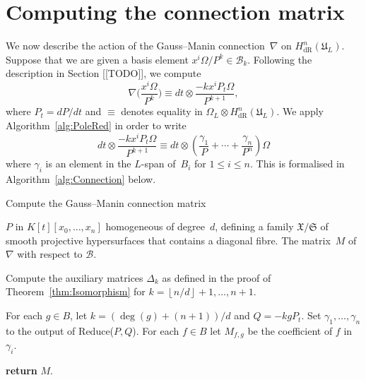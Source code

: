 \documentclass[a4paper,11pt]{article}
\numberwithin{equation}{section}
\providecommand{\floor}[1]{\left\lfloor#1\right\rfloor}   %
\providecommand{\HdR}{H_{\text{dR}}}    %
\providecommand{\cB}{\mathcal{B}} %
\theoremstyle{definition}
\begin{document}

\section{Computing the connection matrix}
\label{sec:Connection}

We now describe the action of the Gauss--Manin connection~$\nabla$ on 
$\HdR^n(\mathfrak{U}_L)$.  Suppose that we are given a basis element 
$x^i \Omega / P^k \in \cB_k$.  Following the description in Section [[TODO]], 
we compute
\begin{equation} \label{eqn:nabla}
\nabla \biggl(\frac{x^i \Omega}{P^k}\biggr) \equiv 
dt \otimes \frac{- k x^i P_t \Omega}{P^{k+1}},
\end{equation}
where $P_t = dP/dt$ and $\equiv$ denotes equality in 
$\Omega_{L} \otimes \HdR^n(\mathfrak{U}_L)$. We apply 
Algorithm~\ref{alg:PoleRed} in order to write
\begin{equation}
dt \otimes \frac{- k x^i P_t \Omega}{P^{k+1}} \equiv 
dt \otimes \left( \frac{\gamma_{1}}{P} + \dotsb + \frac{\gamma_n}{P^n} \right) \Omega
\end{equation}
where $\gamma_i$ is an element in the $L$-span of~$B_i$ for $1 \leq i \leq n$. This is
formalised in Algorithm~\ref{alg:Connection} below.

\begin{algorithm}
\caption{Compute the Gauss--Manin connection matrix}
\label{alg:Connection}
\begin{algorithmic}
\Require $P$ in $K[t][x_0, \dotsc, x_n]$ homogeneous of degree~$d$, 
         defining a family $\mathfrak{X}/\mathfrak{S}$ of smooth projective 
         hypersurfaces that contains a diagonal fibre.
\Ensure  The matrix~$M$ of $\nabla$ with respect to $\cB$.
\State \begin{compactenum}[\it {Step} I.] \vspace{-1.24em}
\item Compute the auxiliary matrices $\Delta_k$  as defined 
      in the proof of Theorem~\ref{thm:Isomorphism}
      for $k = \floor{n/d}+1, \dotsc, n+1$.
\item For each $g \in B$, let $k = (\deg(g)+(n+1))/d$ and $Q = - k g P_t$. 
      Set $\gamma_{1}, \dotsc, \gamma_n$ to the output of 
      {\sc Reduce($P,Q$)}. For each $f \in B$ let $M_{f,g}$ 
      be the coefficient of $f$ in $\gamma_i$.
\item \textbf{return} $M$.
\end{compactenum}
\EndProcedure
\end{algorithmic}
\end{algorithm}
\end{document}
